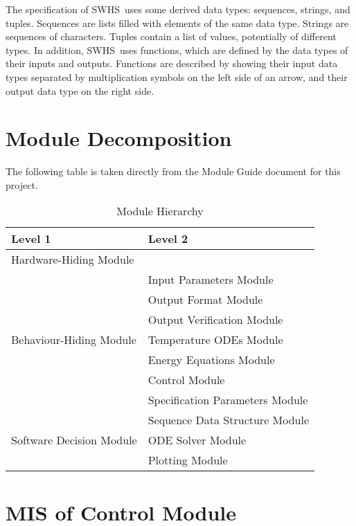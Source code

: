 \documentclass[12pt]{article}
\newcommand{\progname}{SWHS}
\begin{document}
\noindent
The specification of \progname \ uses some derived data types: sequences, strings, and
tuples. Sequences are lists filled with elements of the same data type. Strings
are sequences of characters. Tuples contain a list of values, potentially of
different types. In addition, \progname \ uses functions, which
are defined by the data types of their inputs and outputs. Functions are
described by showing their input data types separated by multiplication symbols
on the left side of an arrow, and their output data type on the right side.

\section{Module Decomposition}

The following table is taken directly from the Module Guide document for this project.

\begin{table}[h!]
\centering
\begin{tabular}{p{} p{}}
\toprule
\textbf{Level 1} & \textbf{Level 2}\\
\midrule

{Hardware-Hiding Module} & ~ \\
\midrule

\multirow{7}{0.3\textwidth}{Behaviour-Hiding Module} & Input Parameters Module\\
& Output Format Module\\
& Output Verification Module\\
& Temperature ODEs Module\\
& Energy Equations Module\\ 
& Control Module\\
& Specification Parameters Module\\
\midrule

\multirow{3}{0.3\textwidth}{Software Decision Module} & {Sequence Data Structure Module}\\
& ODE Solver Module\\
& Plotting Module\\
\bottomrule

\end{tabular}
\caption{Module Hierarchy}
\label{TblMH}
\end{table}

\newpage

\section{MIS of Control Module} \label{Main}
\end{document}

